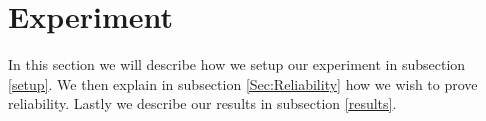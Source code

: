 \section{Experiment}\label{Experiment}
In this section we will describe how we setup our experiment in subsection \ref{setup}. We then explain in subsection \ref{Sec:Reliability} how we wish to prove reliability. Lastly we describe our results in subsection \ref{results}.



